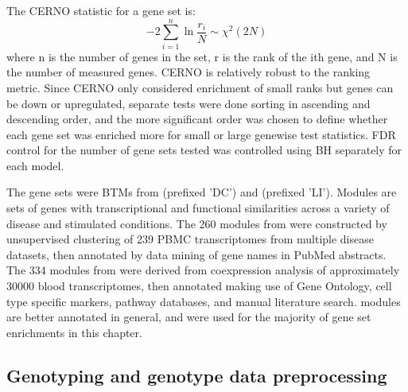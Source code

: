 \begin{outline}
The CERNO statistic for a gene set is:
\begin{equation}
    -2 \sum_{i=1}^{n} \ln \frac{r_i}{N} \sim \chi^2(2N)
\end{equation}
where n is the number of genes in the set,
r is the rank of the ith gene,
and N is the number of measured genes.
CERNO is relatively robust to the ranking metric\autocite{zyla2019GeneSetEnrichment}.
Since CERNO only considered enrichment of small ranks but genes can be down or upregulated, 
separate tests were done sorting in ascending and descending order,
and the more significant order was chosen to define whether each gene set was enriched more for small or large genewise test statistics.
\gls{FDR} control for the number of gene sets tested was controlled using \gls{BH} separately for each model.

The gene sets were \glspl{BTM} from \textcite{chaussabel2008ModularAnalysisFramework} (prefixed 'DC') and \textcite{li2013MolecularSignaturesAntibody} (prefixed 'LI').
Modules are sets of genes with transcriptional and functional similarities across a variety of disease and stimulated conditions.
The 260 modules from \textcite{chaussabel2008ModularAnalysisFramework} were constructed by unsupervised clustering of 239 \gls{PBMC} transcriptomes from multiple disease datasets,
then annotated by data mining of gene names in PubMed abstracts.
The 334 modules from \textcite{li2013MolecularSignaturesAntibody} were derived from coexpression analysis of approximately \num{30000} blood transcriptomes,
then annotated making use of Gene Ontology, cell type specific markers, pathway databases, and manual literature search.
\textcite{li2013MolecularSignaturesAntibody} modules are better annotated in general, and were used for the majority of gene set enrichments in this chapter.


\subsection{Genotyping and genotype data preprocessing}


\end{outline}
